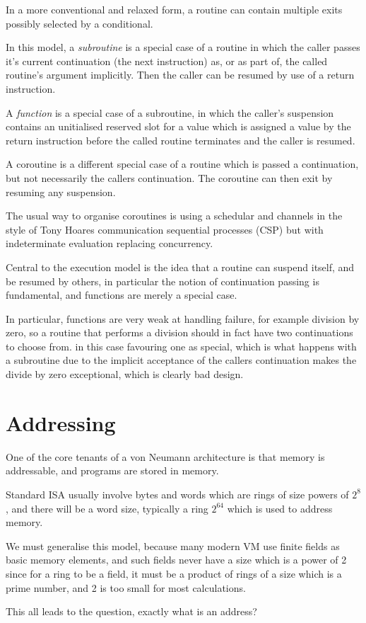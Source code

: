 \documentclass[oneside]{book}
\theoremstyle{plain}
\theoremstyle{definition}
\theoremstyle{plain}
\begin{document}
In a more conventional and relaxed form, a routine can contain multiple
exits possibly selected by a conditional.

In this model, a {\em subroutine} is a special case of a routine in which
the caller passes it's current continuation (the next instruction) as, or as
part of, the called routine's argument implicitly. Then the caller can be resumed
by use of a return instruction.

A {\em function} is a special case of a subroutine, in which the caller's suspension
contains an unitialised reserved slot for a value which is assigned a value
by the return instruction before the called routine terminates and the caller
is resumed.

A coroutine is a different special case of a routine which is passed a continuation,
but not necessarily the callers continuation. The coroutine can then exit by
resuming any suspension.

The usual way to organise coroutines is using a schedular and channels in the style
of Tony Hoares communication sequential processes (CSP) but with indeterminate
evaluation replacing concurrency.

Central to the execution model is the idea that a routine can suspend itself,
and be resumed by others, in particular the notion of continuation passing
is fundamental, and functions are merely a special case.

In particular, functions are very weak at handling failure, for example
division by zero, so a routine that performs a division should in fact
have two continuations to choose from.  in this case favouring one
as special, which is what happens with a subroutine due to the implicit
acceptance of the callers continuation makes the divide by zero exceptional,
which is clearly bad design.

\chapter{Addressing}
One of the core tenants of a von Neumann architecture is that memory is
addressable, and programs are stored in memory.

Standard ISA usually involve bytes and words which are rings of size powers of $2^8$,
and there will be a word size, typically a ring $2^64$ which is used to address memory.

We must generalise this model, because many modern VM use finite fields as basic
memory elements, and such fields never have a size which is a power of 2 since
for a ring to be a field, it must be a product of rings of a size which is a prime number,
and 2 is too small for most calculations.

This all leads to the question, exactly what is an address?
\end{document}

